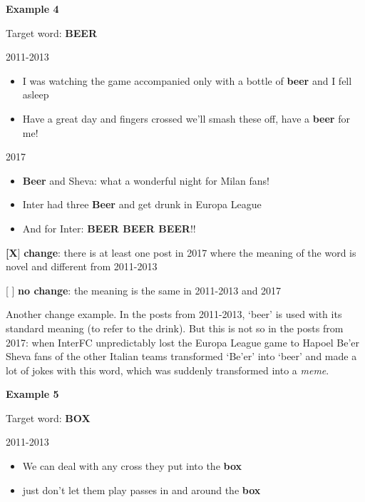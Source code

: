 \documentclass[11pt,a4paper]{article}
\begin{document}
\begin{minipage}{15cm}

\textbf{Example 4}

\vspace*{0.5cm}

Target word: \textbf{BEER}

\vspace*{0.25cm}
2011-2013
\begin{itemize}
\item I was watching the game accompanied only with a bottle of \textbf{beer} and I fell asleep
\item Have a great day and fingers crossed we'll smash these off, have a \textbf{beer} for me!
\end{itemize}

\vspace*{0.25cm}

2017
\begin{itemize}
\item \textbf{Beer} and Sheva: what a wonderful night for Milan fans!
\item Inter had three \textbf{Beer} and get drunk in Europa League
\item And for Inter: \textbf{BEER BEER BEER}!!
\end{itemize}

\vspace*{0.25cm}

\textbf{[X}]  \textbf{change}: there is at least one post in 2017 where the meaning of the word is novel and different from 2011-2013

[  ] \textbf{no change}: the meaning is the same in 2011-2013 and 2017

\vspace*{0.25cm}

Another change example. In the posts from 2011-2013, `beer' is used with its standard meaning (to refer to the drink). But this is not so in the posts from 2017: when InterFC unpredictably lost the Europa League game to Hapoel Be'er Sheva fans of the other Italian teams transformed `Be'er' into `beer' and made a lot of jokes with this word, which was suddenly transformed into a \textit{meme}.
\vspace*{1.5cm}

\textbf{Example 5}

\vspace*{0.5cm}

Target word: \textbf{BOX}

\vspace*{0.25cm}
2011-2013
\begin{itemize}
\item We can deal with any cross they put into the \textbf{box}
\item just don't let them play passes in and around the \textbf{box}
\end{itemize}


\end{minipage}
\end{document}

